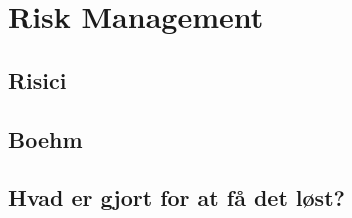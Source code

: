 \chapter{Risk Management}\label{ch:Risk Management}

\section{Risici}

\section{Boehm}


\section{Hvad er gjort for at få det løst?}
